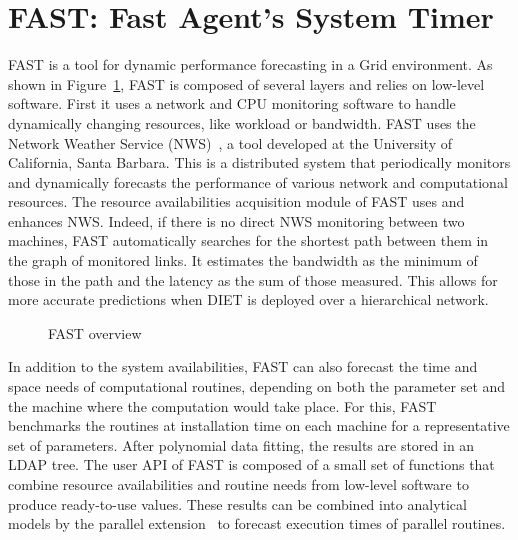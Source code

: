 

\section{FAST: Fast Agent's System Timer}
\label{sec:FAST}

FAST \cite{Qui02} is a tool for dynamic performance forecasting in a
Grid environment. As shown in Figure~\ref{fig:fast-overview}, FAST is composed
of several layers and relies on low-level software. First it uses a network and
CPU monitoring software to handle dynamically changing resources, like workload
or bandwidth.  FAST uses the Network Weather Service (NWS)~\cite{WSH99}, a
tool developed at the University of California, Santa Barbara. This is a
distributed system that periodically monitors and dynamically forecasts the
performance of various network and computational resources. The resource
availabilities acquisition module of FAST uses and enhances NWS. Indeed, if
there is no direct NWS monitoring between two machines, FAST automatically
searches for the shortest path between them in the graph of monitored links. It
estimates the bandwidth as the minimum of those in the path and the latency as
the sum of those measured. This allows for more accurate predictions when DIET
is deployed over a hierarchical network.

\begin{figure}[htb]
  \begin{center}
    \caption{FAST overview}
    \label{fig:fast-overview}
  \end{center}
\end{figure}

In addition to the system availabilities, FAST can also forecast the time and
space needs of computational routines, depending on both the parameter set and
the machine where the computation would take place.  For this, FAST 
benchmarks the routines at installation time on each machine for a
representative set of parameters. After polynomial data fitting, the results
are stored in an LDAP tree.  The user API of FAST is composed of a small set
of functions that combine resource availabilities and routine needs from
low-level software to produce ready-to-use values. These results can be
combined into analytical models by the parallel extension~\cite{CS02} to
forecast execution times of parallel routines.

